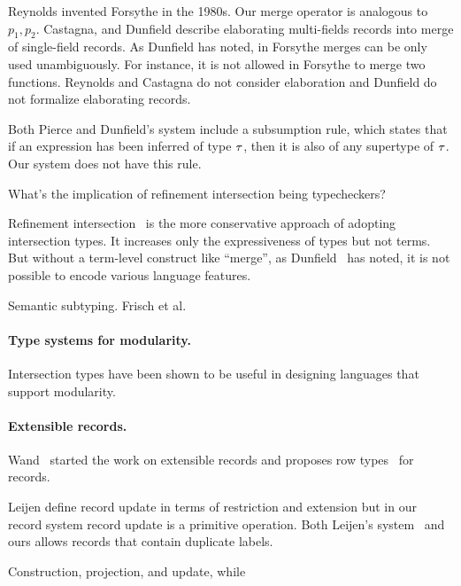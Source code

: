 Reynolds invented Forsythe in the 1980s. Our merge operator is analogous to
$ p_1, p_2 $. Castagna, and Dunfield describe elaborating multi-fields records
into merge of single-field records. As Dunfield has noted, in Forsythe merges
can be only used unambiguously.
For instance, it is not allowed in Forsythe to
merge two functions. Reynolds and Castagna do not consider elaboration and
Dunfield do not formalize elaborating records.

Both Pierce and Dunfield's system include a subsumption rule, which states that
if an expression has been inferred of type $ \tau $, then it is also of any
supertype of $ \tau $. Our system does not have this rule.

What's the implication of refinement intersection being typecheckers?

Refinement intersection~\cite{dunfield2007refined,freeman1991refinement} is the
more conservative approach of adopting intersection types. It increases only the
expressiveness of types but not terms. But without a term-level construct like
``merge'', as Dunfield~\cite{dunfield2014elaborating} has noted, it is not
possible to encode various language features. \cite{davies2005practical}
\cite{dunfield2007refined}

Semantic subtyping. Frisch et al.~\cite{frisch2008semantic}

\paragraph{Type systems for modularity.}

Intersection types have been shown to be useful in designing languages that
support modularity.~\cite{nystrom2006j}

\cite{oliveira2013feature}

\paragraph{Extensible records.}

Wand~\cite{wand1987complete} started the work on extensible records and proposes
row types~\cite{wand1989type} for records.

Leijen define record update in terms of restriction and extension but in our
record system record update is a primitive operation. Both Leijen's
system~\cite{leijen2005extensible} and ours allows records that contain
duplicate labels.

Construction, projection, and update, while

